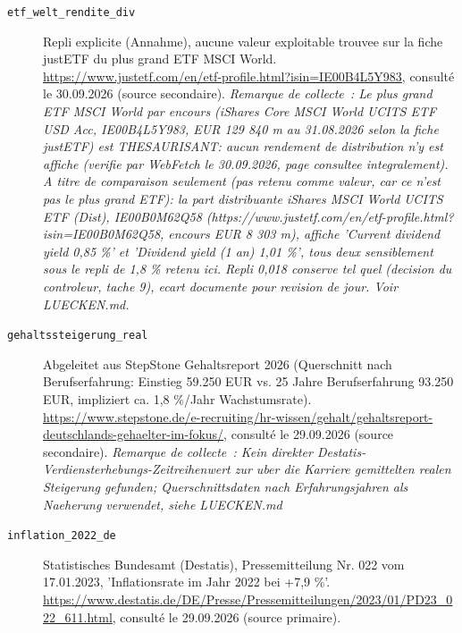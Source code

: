 \begin{description}
\item[\texttt{etf\_welt\_rendite\_div}] \label{src:etf_welt_rendite_div} Repli explicite (Annahme), aucune valeur exploitable trouvee sur la fiche justETF du plus grand ETF MSCI World. \url{https://www.justetf.com/en/etf-profile.html?isin=IE00B4L5Y983}, consulté le 30.09.2026 (source secondaire). \textit{Remarque de collecte~: Le plus grand ETF MSCI World par encours (iShares Core MSCI World UCITS ETF USD Acc, IE00B4L5Y983, EUR 129 840 m au 31.08.2026 selon la fiche justETF) est THESAURISANT: aucun rendement de distribution n'y est affiche (verifie par WebFetch le 30.09.2026, page consultee integralement). A titre de comparaison seulement (pas retenu comme valeur, car ce n'est pas le plus grand ETF): la part distribuante iShares MSCI World UCITS ETF (Dist), IE00B0M62Q58 (https://www.justetf.com/en/etf-profile.html?isin=IE00B0M62Q58, encours EUR 8 303 m), affiche 'Current dividend yield 0,85 \%' et 'Dividend yield (1 an) 1,01 \%', tous deux sensiblement sous le repli de 1,8 \% retenu ici. Repli 0,018 conserve tel quel (decision du controleur, tache 9), ecart documente pour revision de jour. Voir LUECKEN.md.}
\item[\texttt{gehaltssteigerung\_real}] \label{src:gehaltssteigerung_real} Abgeleitet aus StepStone Gehaltsreport 2026 (Querschnitt nach Berufserfahrung: Einstieg 59.250 EUR vs. 25 Jahre Berufserfahrung 93.250 EUR, impliziert ca. 1,8 \%/Jahr Wachstumsrate). \url{https://www.stepstone.de/e-recruiting/hr-wissen/gehalt/gehaltsreport-deutschlands-gehaelter-im-fokus/}, consulté le 29.09.2026 (source secondaire). \textit{Remarque de collecte~: Kein direkter Destatis-Verdiensterhebungs-Zeitreihenwert zur uber die Karriere gemittelten realen Steigerung gefunden; Querschnittsdaten nach Erfahrungsjahren als Naeherung verwendet, siehe LUECKEN.md}
\item[\texttt{inflation\_2022\_de}] \label{src:inflation_2022_de} Statistisches Bundesamt (Destatis), Pressemitteilung Nr. 022 vom 17.01.2023, 'Inflationsrate im Jahr 2022 bei +7,9 \%'. \url{https://www.destatis.de/DE/Presse/Pressemitteilungen/2023/01/PD23_022_611.html}, consulté le 29.09.2026 (source primaire).

\end{description}
